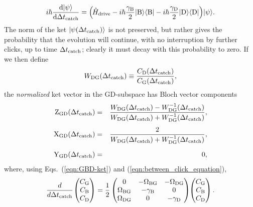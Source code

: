 \documentclass[
						superscriptaddress, 																 amsmath, amssymb,
		 aps,  prb,  
										floatfix,
		linenumbers,
			]{revtex4-1}
\begin{document}
\begin{equation}
i\hbar\frac{\mathrm{d}|\psi\rangle}{\mathrm{d}\Delta t_{\rm catch}}=\left(\mkern-2mu \hat H_{\rm drive}-i\hbar\frac{\gamma_{\rm B}}2|{\rm B}\rangle\langle{\rm B}|-i\hbar\frac{\gamma_{\rm D}}2|{\rm D}\rangle\langle{\rm D}|\right)\mkern-3mu|\psi\rangle.
\label{eqn:between_click_equation}
\end{equation}
The norm of the ket $|\psi(\Delta t_{\rm catch})\rangle$ is not preserved, but rather gives the probability that the evolution will continue, with no interruption by further clicks, up to time $\Delta t_{\rm catch}$; clearly it must decay with this probability to zero.
If we then define
\begin{equation}
W_{\rm DG}(\Delta t_{\rm catch})\equiv\frac{C_{\rm D}(\Delta t_{\rm catch})}{C_{\rm G}(\Delta t_{\rm catch})},
\label{eqn:W_DG_definition}
\end{equation}
the \textit{normalized} ket vector in the GD-subspace has Bloch vector components
\begin{eqnarray}
{\rm Z}_{\rm GD}(\Delta t_{\rm catch})&=&\frac{W_{\rm DG}(\Delta t_{\rm catch})-W_{\rm DG}^{-1}(\Delta t_{\rm catch})}{W_{\rm DG}(\Delta t_{\rm catch})+W_{\rm DG}^{-1}(\Delta t_{\rm catch})},
\label{eqn:Z}\\
\noalign{\vskip4pt}
{\rm X}_{\rm GD}(\Delta t_{\rm catch})&=&\frac2{W_{\rm DG}(\Delta t_{\rm catch})+W_{\rm DG}^{-1}(\Delta t_{\rm catch})},
\label{eqn:X}\\
\noalign{\vskip6pt}
{\rm Y}_{\rm GD}(\Delta t_{\rm catch})&=&0,
\label{eqn:Y}
\end{eqnarray}
where, using Eqs.~(\ref{eqn:GBD-ket}) and (\ref{eqn:between_click_equation}),
\begin{equation}
\frac{d}{d\Delta t_{\rm catch}}\mkern-2mu\left(
\begin{matrix}
C_{\rm G}\\
C_{\rm B}\\
C_{\rm D}
\end{matrix}
\right)=\frac12\left(
\begin{matrix}
0&-\Omega_{\rm BG}&-\Omega_{\rm DG}\\
\Omega_{\rm BG}&-\gamma_{\rm B}&0\\
\Omega_{\rm DG}&0&-\gamma_{\rm D}\\
\end{matrix}
\right)\mkern-4mu\left(
\begin{matrix}
C_{\rm G}\\
C_{\rm B}\\
C_{\rm D}
\end{matrix}
\right).
\label{eqn:3x3_system}
\end{equation}
\end{document}
